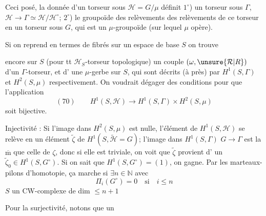 Ceci posé, la donnée d'un torseur sous
$\mathcal H=G/\mu$ définit $1^\circ$) un torseur sous $\Gamma$,
$\mathcal H\longrightarrow\Gamma\simeq\mathcal H/\mathcal H^\circ$; $2^\circ$) le groupoïde des
relèvements des relèvements de ce torseur
en un torseur sous $G$, qui est un
$\mu$-groupoïde  (sur lequel $\mu$ opère).

Si on  reprend en termes de fibrés
sur un espace de base $S$ on trouve

encore sur $S$ (pour tt $\mathcal H_S$-torseur topologique)
un couple $(\omega,\unsure{\mathcal R|R})$ d'un $\Gamma$-torseur, et d'
une $\mu$-gerbe sur $S$, qui sont décrits (à 
 près) par $H^1(S,\Gamma)$ et $H^2(S,\mu)$
respectivement. On voudrait dégager des
conditions  pour que l'application
\[
(70)\qquad H^1(S,\mathcal H)\longrightarrow H^1(S,\Gamma)\times H^2(S,\mu)
\]
soit bijective.

Injectivité : Si l'image 
dans $H^2(S,\mu)$ est nulle,
l'élément de $H^1(S,\mathcal H)$ se relève en un élément $\widetilde\zeta$
de $H^1(S,\widetilde{\mathcal H}=G)$;  l'image dans $H^1(S,\Gamma)$
 $G\longrightarrow\Gamma$ est la $\overline{\mathrm m}$ que celle de $\zeta$, donc si
elle est triviale, on voit que $\widetilde\zeta$ provient d'
un $\widetilde\zeta_0\in H^1(S,G^\circ)$. Si on sait que
$H^1(S,G^\circ)=(1)$, on gagne. Par les
marteaux-pilons d'homotopie, ça marche
si $\exists n\in\mathbb N$ avec
\[
\Pi_i(G^\circ)=0\quad\text{si}\quad i\leq n
\]
$S$ un CW-complexe de dim $\leq n+1$

Pour la surjectivité, notons que  un

